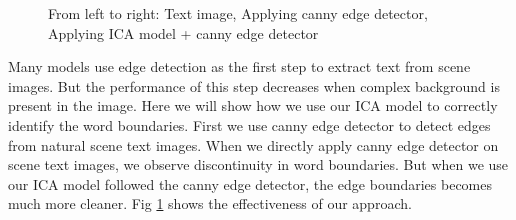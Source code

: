 \begin{figure}[t]
{}
\caption
{From left to right: Text image, Applying canny edge detector, Applying ICA model + canny edge detector}
\label{fig:edge}
\end{figure}
Many models \cite{chap4-6, chap4-7} use edge detection as the first step 
to extract text from scene images. But the performance of this step decreases when 
complex background is present in the image.  
Here we will show how we use our ICA model to correctly identify the word boundaries.
First we use canny edge detector \cite{chap4-5} to detect edges from natural scene text images. 
When we directly apply canny edge detector on scene text images, we observe discontinuity in word boundaries.
But when we use our ICA model followed the canny edge detector, the edge boundaries becomes much more cleaner.
Fig \ref{fig:edge} shows the effectiveness of our approach.

